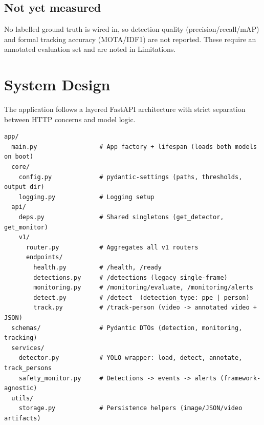 \documentclass[11pt,a4paper]{article}
\begin{document}
\subsection{Not yet measured}
No labelled ground truth is wired in, so detection quality
(precision/recall/mAP) and formal tracking accuracy (MOTA/IDF1) are not
reported. These require an annotated evaluation set and are noted in
Limitations.

\section{System Design}

The application follows a layered FastAPI architecture with strict separation
between HTTP concerns and model logic.

\begin{lstlisting}
app/
  main.py                 # App factory + lifespan (loads both models on boot)
  core/
    config.py             # pydantic-settings (paths, thresholds, output dir)
    logging.py            # Logging setup
  api/
    deps.py               # Shared singletons (get_detector, get_monitor)
    v1/
      router.py           # Aggregates all v1 routers
      endpoints/
        health.py         # /health, /ready
        detections.py     # /detections (legacy single-frame)
        monitoring.py     # /monitoring/evaluate, /monitoring/alerts
        detect.py         # /detect  (detection_type: ppe | person)
        track.py          # /track-person (video -> annotated video + JSON)
  schemas/                # Pydantic DTOs (detection, monitoring, tracking)
  services/
    detector.py           # YOLO wrapper: load, detect, annotate, track_persons
    safety_monitor.py     # Detections -> events -> alerts (framework-agnostic)
  utils/
    storage.py            # Persistence helpers (image/JSON/video artifacts)
\end{lstlisting}
\end{document}
